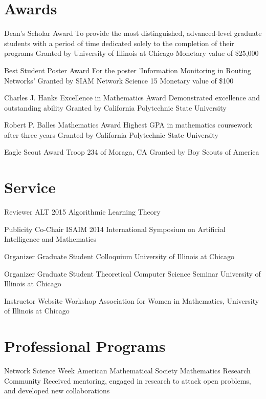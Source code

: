 \documentclass[11pt]{moderncv}
\begin{document}
   \section{Awards}
         {Dean's Scholar Award}
      {To provide the most distinguished, advanced-level graduate students with a period of time dedicated solely to the completion of their programs}
      {Granted by University of Illinois at Chicago}
      {}
      {Monetary value of \$25,000}

         {Best Student Poster Award}
      {For the poster 'Information Monitoring in Routing Networks'}
      {Granted by SIAM Network Science 15}
      {}
      {Monetary value of \$100}

         {Charles J. Hanks Excellence in Mathematics Award}
      {Demonstrated excellence and outstanding ability}
      {Granted by California Polytechnic State University}
      {}
{}

         {Robert P. Balles Mathematics Award}
      {Highest GPA in mathematics coursework after three years}
      {Granted by California Polytechnic State University}
      {}
{}

         {Eagle Scout Award}
      {Troop 234 of Moraga, CA}
      {Granted by Boy Scouts of America}
      {}
{}


   \section{Service}
         {Reviewer}
      {ALT 2015}
      {Algorithmic Learning Theory}
      {}
{}

         {Publicity Co-Chair}
      {ISAIM 2014}
      {International Symposium on Artificial Intelligence and Mathematics}
      {}
{}

         {Organizer}
      {Graduate Student Colloquium}
      {University of Illinois at Chicago}
      {}
{}

         {Organizer}
      {Graduate Student Theoretical Computer Science Seminar}
      {University of Illinois at Chicago}
      {}
{}

         {Instructor}
      {Website Workshop}
      {Association for Women in Mathematics, University of Illinois at Chicago}
      {}
{}


   \section{Professional Programs}
         {Network Science Week}
      {American Mathematical Society Mathematics Research Community}
      {}
      {}
      {Received mentoring, engaged in research to attack open problems, and developed new collaborations}
\end{document}
